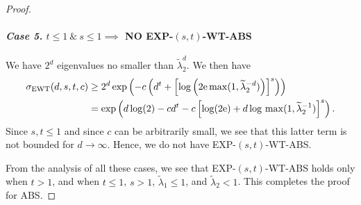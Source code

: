 \documentclass[graybox]{svmult}
\newcommand{\tlambda}{\widetilde{\lambda}}
\newcommand{\me}{\mathrm{e}}
\newcommand{\SEWT}{\sigma_{\textup{EWT}}}
\newcommand{\EXP}{\textup{EXP}\xspace}
\newcommand{\ABS}{\textup{ABS}\xspace}
\newcommand{\WT}{\textup{WT}\xspace}
\begin{document}
\begin{proof}
\paragraph{\textit{Case 5.} $t\le 1 \ \&  \ s \le 1 \implies$ NO \EXP-$(s,t)$-\WT-\ABS} \label{Case111e} 

We have $2^d$ eigenvalues no smaller than $\tlambda_2^d$.
We then have
\begin{align*}
      \SEWT(d,s,t,c) & \ge 2^d
            \exp\left(-c\left(d^t +
            \left[\log\left(2\me \max(1,\tlambda_2^{-d})
            \right)\right]^s\right)\right)\\
      & = 
      \exp\left(d \log(2) - cd^t -c\left[\log (2\me) +d\log \, \max(1,\tlambda_2^{-1})\right]^s\right).
\end{align*}
Since $s,t\le 1$ and since $c$ can be arbitrarily small,
we see that this latter term is not bounded for $d\rightarrow\infty$.
        Hence, we do not have \EXP-$(s,t)$-\WT-\ABS.

{}From the analysis of all these cases, we see that
\EXP-$(s,t)$-\WT-\ABS holds only when $t>1$, and
when $t\le 1$, $s>1$,
$\tlambda_1\le1$, and $\tlambda_2<1$. This completes the proof for \ABS.


\end{proof}
\end{document}
